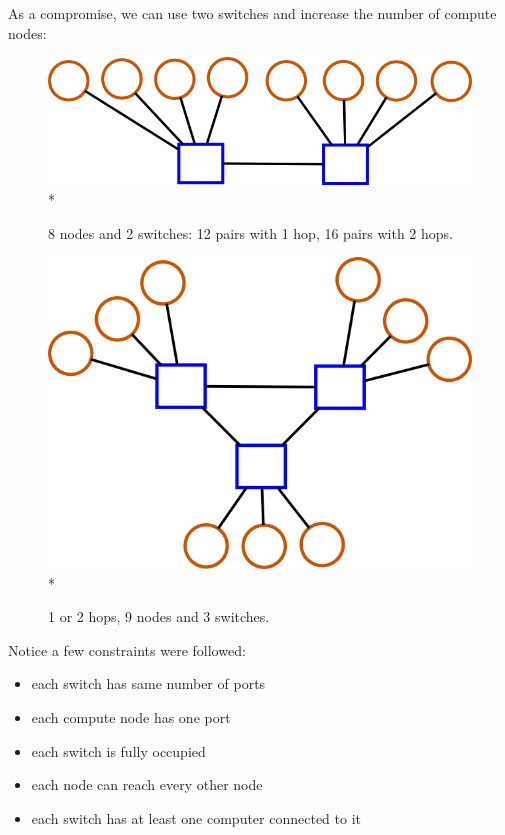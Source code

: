 \documentclass[pdftex]{article}
\begin{document}
As a compromise, we can use two switches and increase the number of compute nodes:

\begin{figure}[h!]
\begin{center}
\includegraphics[scale=0.2]{pictures/N8_n1_M2_m5.png}\\*
\caption{8 nodes and 2 switches: 12 pairs with 1 hop, 16 pairs with 2 hops.}
\end{center}
\end{figure}

\begin{figure}[h!]
\begin{center}
\includegraphics[scale=0.2]{pictures/N9_n1_M4_m5.png}\\*
\caption{1 or 2 hops, 9 nodes and 3 switches.}
\end{center}
\end{figure}
Notice a few constraints were followed:
\begin{itemize}
 \item each switch has same number of ports
 \item each compute node has one port
 \item each switch is fully occupied
 \item each node can reach every other node
 \item each switch has at least one computer connected to it
\end{itemize}
\end{document}

